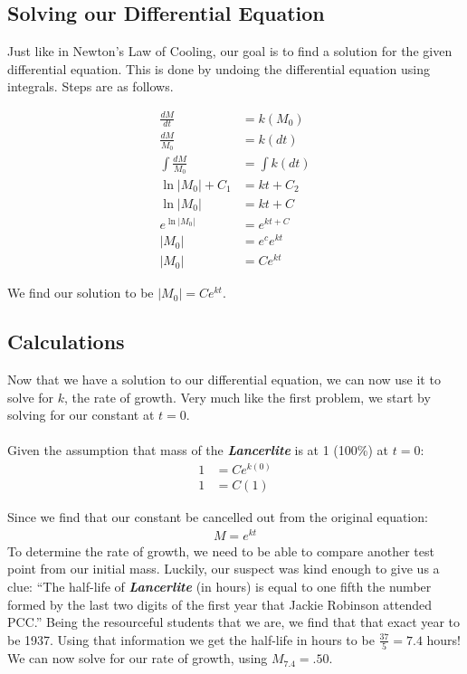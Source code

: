 \documentclass{article}
\begin{document}
\subsection{Solving our Differential Equation}
Just like in Newton's Law of Cooling, our goal is to find a solution for the given differential equation. This is done by undoing the differential equation using integrals. Steps are as follows.

\begin{align}
    \frac{dM}{dt}&=k(M_0) \\[1em]
    \frac{dM}{M_0} &= k(dt) \\[1em]
    \int \frac{dM}{M_0} &= \int k(dt)\\[1em]
    \ln|M_0|+C_1 &= kt+C_2\\[1em]
    \ln|M_0| &= kt+C\\[1em]
    e^{\ln|M_0|} &= e^{kt+C}\\[1em]
    |M_0| &= e^{c}e^{kt}\\[1em]
    |M_0| &= Ce^{kt}
\end{align}

We find our solution to be $\boxed{|M_0| = Ce^{kt}}$.

\subsection{Calculations}
Now that we have a solution to our differential equation,  we can now use it to solve for $k$, the rate of growth. Very much like the first problem, we start by solving for our constant at $t = 0$.\\\\
Given the assumption that mass of the \textbf{\textit{Lancerlite}} is at 1 (100\%) at $t = 0$:
\begin{align}
    1 &= Ce^{k(0)}\\
    1 & = C(1)
\end{align}

Since we find that  our constant be cancelled out from the original equation:
\begin{align}
    M = e^{kt}    
\end{align}
To determine the rate of growth, we need to be able to compare another test point from our initial mass. Luckily, our suspect was kind enough to give us a clue: ``The half-life of \textbf{\textit{Lancerlite}} (in hours) is equal to one fifth the number formed by the last two digits of the first year that Jackie Robinson attended PCC.'' Being the resourceful students that we are, we find that that exact year to be 1937. Using that information we get the half-life in hours to be $\frac{37}{5} = 7.4$ hours! We can now solve for our rate of growth, using $M_{7.4} = .50$.\\
\end{document}
